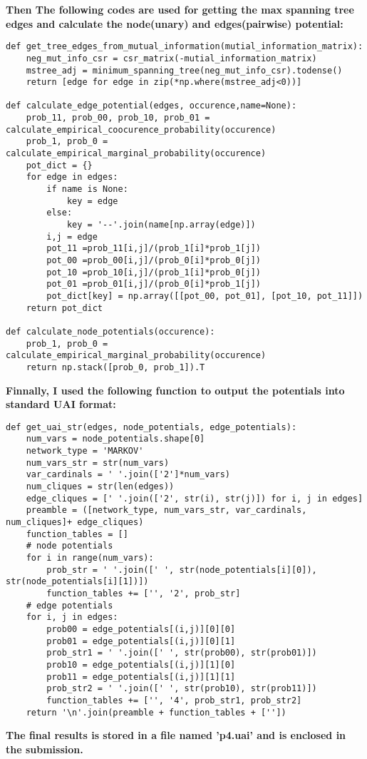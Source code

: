 \documentclass{article}
\begin{document}
\begin{enumerate}
\textbf{Then The following codes are used for getting the max spanning tree edges and calculate the node(unary) and edges(pairwise) potential:}
\begin{verbatim}
def get_tree_edges_from_mutual_information(mutial_information_matrix):
    neg_mut_info_csr = csr_matrix(-mutial_information_matrix)
    mstree_adj = minimum_spanning_tree(neg_mut_info_csr).todense()
    return [edge for edge in zip(*np.where(mstree_adj<0))]

def calculate_edge_potential(edges, occurence,name=None):
    prob_11, prob_00, prob_10, prob_01 = calculate_empirical_coocurence_probability(occurence)
    prob_1, prob_0 = calculate_empirical_marginal_probability(occurence)
    pot_dict = {}
    for edge in edges:
        if name is None:
            key = edge
        else:
            key = '--'.join(name[np.array(edge)])
        i,j = edge
        pot_11 =prob_11[i,j]/(prob_1[i]*prob_1[j])
        pot_00 =prob_00[i,j]/(prob_0[i]*prob_0[j])
        pot_10 =prob_10[i,j]/(prob_1[i]*prob_0[j])
        pot_01 =prob_01[i,j]/(prob_0[i]*prob_1[j])
        pot_dict[key] = np.array([[pot_00, pot_01], [pot_10, pot_11]])
    return pot_dict

def calculate_node_potentials(occurence):
    prob_1, prob_0 = calculate_empirical_marginal_probability(occurence)
    return np.stack([prob_0, prob_1]).T
\end{verbatim}

\textbf{Finnally, I used the following function to output the potentials into standard UAI format:}

\begin{verbatim}
def get_uai_str(edges, node_potentials, edge_potentials):
    num_vars = node_potentials.shape[0]
    network_type = 'MARKOV'
    num_vars_str = str(num_vars)
    var_cardinals = ' '.join(['2']*num_vars)
    num_cliques = str(len(edges))
    edge_cliques = [' '.join(['2', str(i), str(j)]) for i, j in edges]
    preamble = ([network_type, num_vars_str, var_cardinals, num_cliques]+ edge_cliques)
    function_tables = []
    # node potentials
    for i in range(num_vars):
        prob_str = ' '.join([' ', str(node_potentials[i][0]), str(node_potentials[i][1])])
        function_tables += ['', '2', prob_str]
    # edge potentials
    for i, j in edges:
        prob00 = edge_potentials[(i,j)][0][0]
        prob01 = edge_potentials[(i,j)][0][1]
        prob_str1 = ' '.join([' ', str(prob00), str(prob01)])
        prob10 = edge_potentials[(i,j)][1][0]
        prob11 = edge_potentials[(i,j)][1][1]
        prob_str2 = ' '.join([' ', str(prob10), str(prob11)])
        function_tables += ['', '4', prob_str1, prob_str2]
    return '\n'.join(preamble + function_tables + [''])
\end{verbatim}
\textbf{The final results is stored in a file named 'p4.uai' and is enclosed in the submission.}

\end{enumerate}
\end{document}
